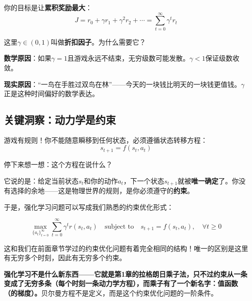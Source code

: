你的目标是让\textbf{累积奖励最大}：
\begin{equation}
    J = r_0 + \gamma r_1 + \gamma^2 r_2 + \cdots = \sum_{t=0}^{\infty} \gamma^t r_t
\end{equation}

这里$\gamma \in (0,1)$叫做\textbf{折扣因子}。为什么需要它？

\textbf{数学原因}：如果$\gamma = 1$且游戏永远不结束，无穷级数可能发散。$\gamma < 1$保证级数收敛。

\textbf{现实原因}：“一鸟在手胜过双鸟在林”——今天的一块钱比明天的一块钱更值钱。$\gamma$正是这种时间偏好的数学表达。

\subsection{关键洞察：动力学是约束}

游戏有规则！你不能随意瞬移到任何状态，必须遵循状态转移方程：
\begin{equation}
    s_{t+1} = f(s_t, a_t)
\end{equation}

停下来想一想：这个方程在说什么？

它说的是：给定当前状态$s_t$和你的动作$a_t$，下一个状态$s_{t+1}$就被\textbf{唯一确定}了。你没有选择的余地——这是物理世界的规则，是你必须遵守的\textbf{约束}。

于是，强化学习问题可以写成我们熟悉的约束优化形式：

\begin{keyformula}[title=强化学习的约束优化形式]
\begin{equation}
    \max_{\{a_t\}_{t=0}^{\infty}} \sum_{t=0}^{\infty} \gamma^t r(s_t, a_t) \quad \text{subject to} \quad s_{t+1} = f(s_t, a_t), \quad \forall t \geq 0
\end{equation}
\end{keyformula}

这和我们在前面章节学过的约束优化问题有着完全相同的结构！唯一的区别是这里有无穷多个时刻，因此有无穷多个约束。

\begin{tcolorbox}[colback=yellow!10, colframe=orange!80, title=本章的核心观点]
\textbf{强化学习不是什么新东西——它就是第1章的拉格朗日乘子法，只不过约束从一条变成了无穷多条（每个时刻一条动力学方程），而乘子有了一个新名字：值函数（的梯度）。}贝尔曼方程不是定义，而是这个约束优化问题的一阶条件。
\end{tcolorbox}

